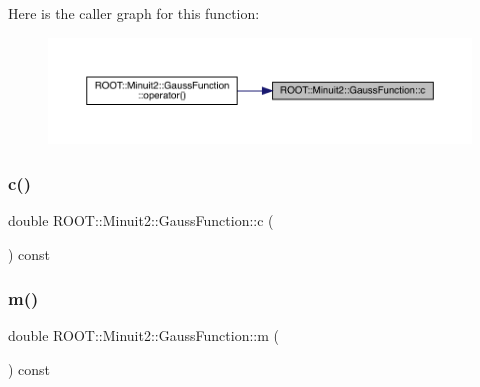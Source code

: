 Here is the caller graph for this function\+:
\nopagebreak
\begin{figure}[H]
\begin{center}
\leavevmode
\includegraphics[width=350pt]{d7/d62/classROOT_1_1Minuit2_1_1GaussFunction_a47a6fa37ae77d53b45da55353094c79e_icgraph}
\end{center}
\end{figure}
\mbox{\label{classROOT_1_1Minuit2_1_1GaussFunction_a47a6fa37ae77d53b45da55353094c79e}} 
\subsubsection{\texorpdfstring{c()}{c()}\hspace{0.1cm}{\footnotesize\ttfamily [2/2]}}
{\footnotesize\ttfamily double R\+O\+O\+T\+::\+Minuit2\+::\+Gauss\+Function\+::c (\begin{DoxyParamCaption}{ }\end{DoxyParamCaption}) const\hspace{0.3cm}{\ttfamily [inline]}}

\mbox{\label{classROOT_1_1Minuit2_1_1GaussFunction_a746dc27d10faf57599e9a0a5bc232a1d}} 
\subsubsection{\texorpdfstring{m()}{m()}\hspace{0.1cm}{\footnotesize\ttfamily [1/2]}}
{\footnotesize\ttfamily double R\+O\+O\+T\+::\+Minuit2\+::\+Gauss\+Function\+::m (\begin{DoxyParamCaption}{ }\end{DoxyParamCaption}) const\hspace{0.3cm}{\ttfamily [inline]}}

